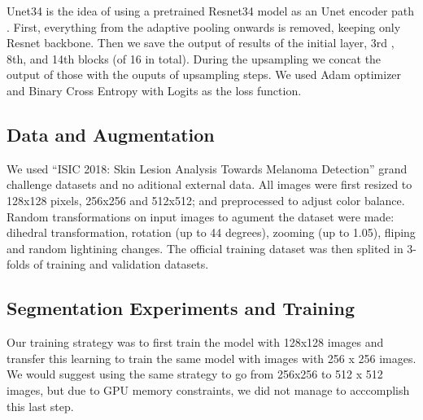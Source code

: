 \documentclass[conference]{IEEEtran}
\begin{document}
Unet34 is the idea of using a pretrained Resnet34 model as an Unet encoder path \cite{fastai}. First, everything from the adaptive pooling onwards is removed, keeping only Resnet backbone. Then we save the output of results of the initial layer, 3rd , 8th, and 14th blocks (of 16 in total). During the upsampling we concat the output of those with the ouputs of upsampling steps. We used Adam optimizer and Binary Cross Entropy with Logits as the loss function.

\subsection{Data and Augmentation}
We used “ISIC 2018: Skin Lesion Analysis Towards Melanoma Detection” grand challenge datasets \cite{codella, ham} and no aditional external data. All images were first resized to 128x128 pixels, 256x256 and 512x512; and preprocessed to adjust color balance. Random transformations on input images to agument the dataset were made: dihedral transformation, rotation (up to 44 degrees), zooming (up to 1.05), fliping and random lightining changes. The official training dataset was then splited in 3-folds of training and validation datasets.  


\subsection{Segmentation Experiments and Training}
\label{sec:seg_training}
Our training strategy was to first train the model with 128x128 images and transfer this learning to train the same model with images with 256 x 256 images. We would suggest using the same strategy to go from 256x256 to 512 x 512 images, but due to GPU memory constraints, we did not manage to acccomplish this last step.
\end{document}
